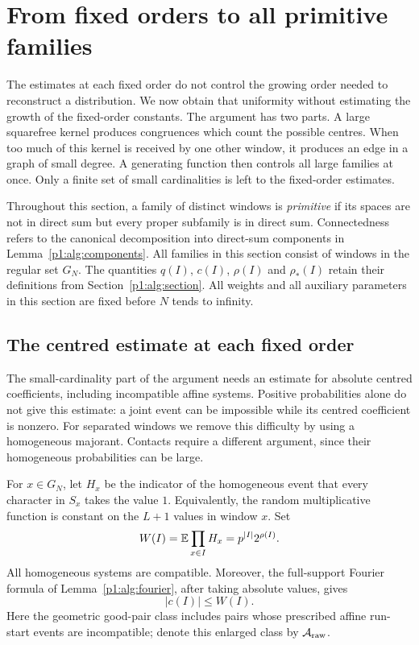 \section{From fixed orders to all primitive families}
\label{p1:core:section}

The estimates at each fixed order do not control the growing order needed
to reconstruct a distribution. We now obtain that uniformity without
estimating the growth of the fixed-order constants. The argument has two
parts. A large squarefree kernel produces congruences which count the
possible centres. When too much of this kernel is received by one other
window, it produces an edge in a graph of small degree. A generating
function then controls all large families at once. Only a finite set of
small cardinalities is left to the fixed-order estimates.

Throughout this section, a family of distinct windows is \emph{primitive}
if its spaces are not in direct sum but every proper subfamily is in
direct sum. Connectedness refers to the canonical decomposition into direct-sum
components in Lemma~\ref{p1:alg:components}.
All families in this section consist of windows in the regular set $G_N$.
The quantities $q(I)$, $c(I)$, $\rho(I)$ and $\rho_*(I)$ retain their
definitions from Section~\ref{p1:alg:section}. All weights and all auxiliary
parameters in this section are fixed before $N$ tends to infinity.

\subsection{The centred estimate at each fixed order}

The small-cardinality part of the argument needs an estimate for absolute
centred coefficients, including incompatible affine systems. Positive
probabilities alone do not give this estimate: a joint event can be
impossible while its centred coefficient is nonzero. For separated windows
we remove this difficulty by using a homogeneous majorant. Contacts require
a different argument, since their homogeneous probabilities can be large.

For $x\in G_N$, let $H_x$ be the indicator of the homogeneous event that
every character in $S_x$ takes the value $1$. Equivalently, the random
multiplicative function is constant on the $L+1$ values in window $x$. Set
\begin{equation}
 W(I)=\mathbb E\prod_{x\in I}H_x
      =p^{|I|}2^{\rho(I)}.
 \label{p1:core:homogeneous-weight}
\end{equation}
All homogeneous systems are compatible. Moreover, the full-support Fourier
formula of Lemma~\ref{p1:alg:fourier}, after taking absolute values, gives
\begin{equation}
 |c(I)|\le W(I).
 \label{p1:core:homogeneous-majorant}
\end{equation}
Here the geometric good-pair class includes pairs whose prescribed affine
run-start events are incompatible; denote this enlarged class by
$\mathcal A_{\rm raw}$.

